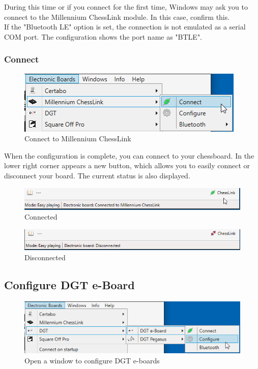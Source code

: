 \documentclass[11pt,a4paper]{article}
\begin{document}
During this time or if you connect for the first time, Windows may ask you to connect to the Millennium ChessLink module. In this case, confirm this.\\

If the "Bluetooth LE" option is set, the connection is not emulated as a serial COM port. The configuration shows the port name as "BTLE".


\subsubsection{Connect}
\begin{figure}[H]
	\centering
	\includegraphics[scale=1.0]{MillenniumChessLink6.png}
	\caption{Connect to Millennium ChessLink}
	\label{fig:MillenniumChessLink6}
\end{figure}
When the configuration is complete, you can connect to your chessboard.
In the lower right corner appears a new button, which allows you to easily connect or disconnect your board. The current status is also displayed.

\begin{figure}[H]
	\centering
	\includegraphics[scale=0.8]{MillenniumChessLink7.png}
	\caption{Connected}
	\label{fig:MillenniumChessLink7}
\end{figure}

\begin{figure}[H]
	\centering
	\includegraphics[scale=0.8]{MillenniumChessLink8.png}
	\caption{Disconnected}
	\label{fig:MillenniumChessLink8}
\end{figure}

\subsection{Configure DGT e-Board} \label{ConfigureDGTEBoard}
\begin{figure}[H]
	\centering
	\includegraphics[scale=0.8]{DGTEBoard1.png}
	\caption{Open a window to configure DGT e-boards }
	\label{fig:DGTEBoard1}
\end{figure}
\end{document}
